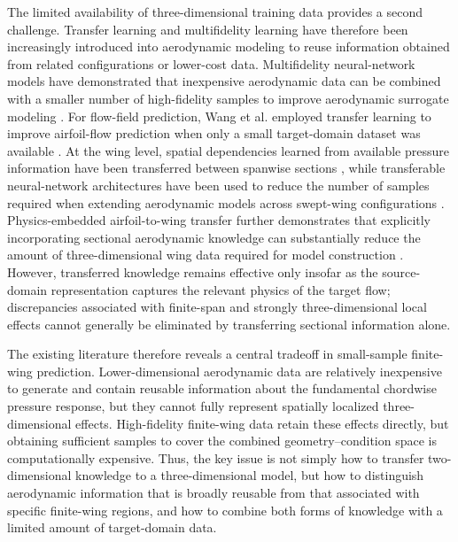 The limited availability of three-dimensional training data provides a second challenge. Transfer learning and multifidelity learning have therefore been increasingly introduced into aerodynamic modeling to reuse information obtained from related configurations or lower-cost data. Multifidelity neural-network models have demonstrated that inexpensive aerodynamic data can be combined with a smaller number of high-fidelity samples to improve aerodynamic surrogate modeling \cite{Zhang2021MultifidelityDNN,Li2022Multifidelity,Leng2024VariableFidelity}. For flow-field prediction, Wang et al. employed transfer learning to improve airfoil-flow prediction when only a small target-domain dataset was available \cite{Wang2023DeepTransfer}. At the wing level, spatial dependencies learned from available pressure information have been transferred between spanwise sections \cite{Qu2022SpatialTransfer}, while transferable neural-network architectures have been used to reduce the number of samples required when extending aerodynamic models across swept-wing configurations \cite{Yang2024TransferableWing}. Physics-embedded airfoil-to-wing transfer further demonstrates that explicitly incorporating sectional aerodynamic knowledge can substantially reduce the amount of three-dimensional wing data required for model construction \cite{Yang2025PhysicsEmbeddedTransfer}. However, transferred knowledge remains effective only insofar as the source-domain representation captures the relevant physics of the target flow; discrepancies associated with finite-span and strongly three-dimensional local effects cannot generally be eliminated by transferring sectional information alone.

The existing literature therefore reveals a central tradeoff in small-sample finite-wing prediction. Lower-dimensional aerodynamic data are relatively inexpensive to generate and contain reusable information about the fundamental chordwise pressure response, but they cannot fully represent spatially localized three-dimensional effects. High-fidelity finite-wing data retain these effects directly, but obtaining sufficient samples to cover the combined geometry--condition space is computationally expensive. Thus, the key issue is not simply how to transfer two-dimensional knowledge to a three-dimensional model, but how to distinguish aerodynamic information that is broadly reusable from that associated with specific finite-wing regions, and how to combine both forms of knowledge with a limited amount of target-domain data.

